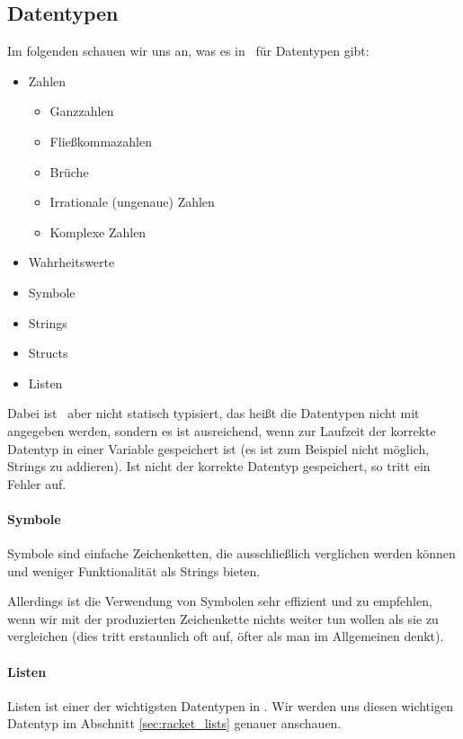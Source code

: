 \subsection{Datentypen}
	
	Im folgenden schauen wir uns an, was es in \racket\, für Datentypen gibt:
	\begin{itemize}
		\item Zahlen
			\begin{itemize}
				\item Ganzzahlen
				\item Fließkommazahlen
				\item Brüche
				\item Irrationale (ungenaue) Zahlen
				\item Komplexe Zahlen
			\end{itemize}
		\item Wahrheitswerte
		\item Symbole
		\item Strings
		\item Structs
		\item Listen
	\end{itemize}

	Dabei ist \racket\, aber nicht statisch typisiert, das heißt die Datentypen nicht mit angegeben werden, sondern es ist ausreichend, wenn zur Laufzeit der korrekte Datentyp in einer Variable gespeichert ist (es ist zum Beispiel nicht möglich, Strings zu addieren). Ist nicht der korrekte Datentyp gespeichert, so tritt ein Fehler auf.
	
	\paragraph{Symbole}
		Symbole sind einfache Zeichenketten, die ausschließlich verglichen werden können und weniger Funktionalität als Strings bieten.
		
		Allerdings ist die Verwendung von Symbolen sehr effizient und zu empfehlen, wenn wir mit der produzierten Zeichenkette nichts weiter tun wollen als sie zu vergleichen (dies tritt erstaunlich oft auf, öfter als man im Allgemeinen denkt).
	
	\paragraph{Listen}
		Listen ist einer der wichtigsten Datentypen in \racket. Wir werden uns diesen wichtigen Datentyp im Abschnitt \ref{sec:racket_lists} genauer anschauen.
	
